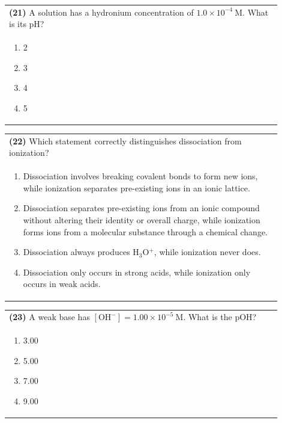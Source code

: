 \documentclass{article}
\begin{document}
\noindent\begin{tabular}{|p{0.9\linewidth}|}
\hline
\textbf{(21)} A solution has a hydronium concentration of $1.0\times10^{-4}\ \text{M}$. What is its pH? \\[0.2cm]
\begin{minipage}[t]{0.85\linewidth}
\begin{enumerate}[label=\alph*.]
\item 2 \item 3 \item 4 \item 5
\end{enumerate}
\end{minipage}\\[0.2cm]
\hline
\end{tabular}

\noindent\begin{tabular}{|p{0.9\linewidth}|}
\hline
\textbf{(22)} Which statement correctly distinguishes dissociation from ionization? \\[0.2cm]
\begin{minipage}{0.85\linewidth}
\begin{enumerate}[label=\alph*.]
\item Dissociation involves breaking covalent bonds to form new ions, while ionization separates pre-existing ions in an ionic lattice.
\item Dissociation separates pre-existing ions from an ionic compound without altering their identity or overall charge, while ionization forms ions from a molecular substance through a chemical change.
\item Dissociation always produces H$_3$O$^+$, while ionization never does.
\item Dissociation only occurs in strong acids, while ionization only occurs in weak acids.
\end{enumerate}
\end{minipage}\\[0.2cm]
\hline
\end{tabular}

\noindent\begin{tabular}{|p{0.9\linewidth}|}
\hline
\textbf{(23)} A weak base has $[\text{OH}^-] = 1.00\times10^{-5}\ \text{M}$. What is the pOH? \\[0.2cm]
\begin{minipage}{0.85\linewidth}
\begin{enumerate}[label=\alph*.]
\item 3.00 \item 5.00 \item 7.00 \item 9.00
\end{enumerate}
\end{minipage}\\[0.2cm]
\hline
\end{tabular}
\end{document}
